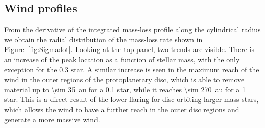 \documentclass[usenatbib,useAMS,usedcolumn]{mnras}
\begin{document}
\subsection{Wind profiles}\label{sec:wind-prof}
From the derivative of the integrated mass-loss profile along the cylindrical radius we obtain the radial distribution of the mass-loss rate shown in Figure~\ref{fig:Sigmadot}. Looking at the top panel, two trends are visible. There is an increase of the peak location as a function of stellar mass, with the only exception for the \SI{0.3}{\solarmass} star. A similar increase is seen in the maximum reach of the wind in the outer regions of the protoplanetary disc, which is able to remove material up to \SI{\sim 35}{\astronomicalunit} for a \SI{0.1}{\solarmass} star, while it reaches \SI{\sim 270}{\astronomicalunit} for a \SI{1}{\solarmass} star. This is a direct result of the lower flaring for disc orbiting larger mass stars, which allows the wind to have a further reach in the outer disc regions and generate a more massive wind.
\end{document}
